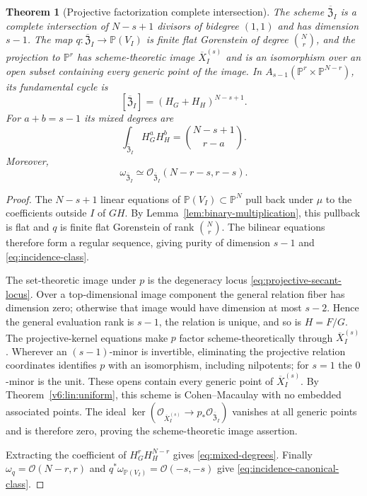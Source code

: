 \documentclass[10pt,fleqn]{article}
\numberwithin{equation}{section}
\newtheorem{theorem}{Theorem}[section]
\newcommand{\PP}{\mathbb P}
\begin{document}
\begin{theorem}[Projective factorization complete intersection]
\label{thm:projective-factorization-CI}
The scheme $\overline{\mathfrak Z}_I$ is a complete intersection of $N-s+1$ divisors of
bidegree $(1,1)$ and has dimension $s-1$.  The map
$q:\overline{\mathfrak Z}_I\to\PP(V_I)$ is finite flat Gorenstein of degree
$\binom Nr$, and the projection to $\PP^r$ has scheme-theoretic image
$\overline X_I^{(s)}$ and is an isomorphism over an open subset
containing every generic point of the image.
In $A_{s-1}(\PP^r\times\PP^{N-r})$, its fundamental cycle is
\begin{equation}\label{eq:incidence-class}
 [\overline{\mathfrak Z}_I]=(H_G+H_H)^{N-s+1}.
\end{equation}
For $a+b=s-1$ its mixed degrees are
\begin{equation}\label{eq:mixed-degrees}
 \int_{\overline{\mathfrak Z}_I}H_G^aH_H^b
 =\binom{N-s+1}{r-a}.
\end{equation}
Moreover,
\begin{equation}\label{eq:incidence-canonical-class}
 \omega_{\overline{\mathfrak Z}_I}
 \simeq\mathcal O_{\overline{\mathfrak Z}_I}(N-r-s,r-s).
\end{equation}
\end{theorem}

\begin{proof}
The $N-s+1$ linear equations of $\PP(V_I)\subset\PP^N$ pull back under
$\mu$ to the coefficients outside $I$ of $GH$.  By
Lemma~\ref{lem:binary-multiplication}, this pullback is flat and $q$
is finite flat Gorenstein of rank $\binom Nr$.  The bilinear equations
therefore form a regular sequence, giving purity of dimension $s-1$
and \eqref{eq:incidence-class}.

The set-theoretic image under $p$ is the degeneracy locus
\eqref{eq:projective-secant-locus}.  Over a top-dimensional image
component the general relation fiber has dimension zero; otherwise
that image would have dimension at most $s-2$.  Hence the general
evaluation rank is $s-1$, the relation is unique, and so is $H=F/G$.
The projective-kernel equations make $p$ factor scheme-theoretically
through $\overline X_I^{(s)}$.  Wherever an $(s-1)$-minor is invertible,
eliminating the projective relation coordinates identifies $p$ with an
isomorphism, including nilpotents; for $s=1$ the $0$-minor is the unit.
These opens contain every generic point of $\overline X_I^{(s)}$.
By Theorem~\ref{v6:lin:uniform}, this scheme is Cohen--Macaulay with no
embedded associated points.  The ideal
$\ker(\mathcal O_{\overline X_I^{(s)}}\to
p_*\mathcal O_{\overline{\mathfrak Z}_I})$ vanishes at all generic
points and is therefore zero, proving the scheme-theoretic image assertion.

Extracting the coefficient of $H_G^rH_H^{N-r}$ gives
\eqref{eq:mixed-degrees}.  Finally
$\omega_q=\mathcal O(N-r,r)$ and
$q^*\omega_{\PP(V_I)}=\mathcal O(-s,-s)$ give
\eqref{eq:incidence-canonical-class}.
\end{proof}
\end{document}
